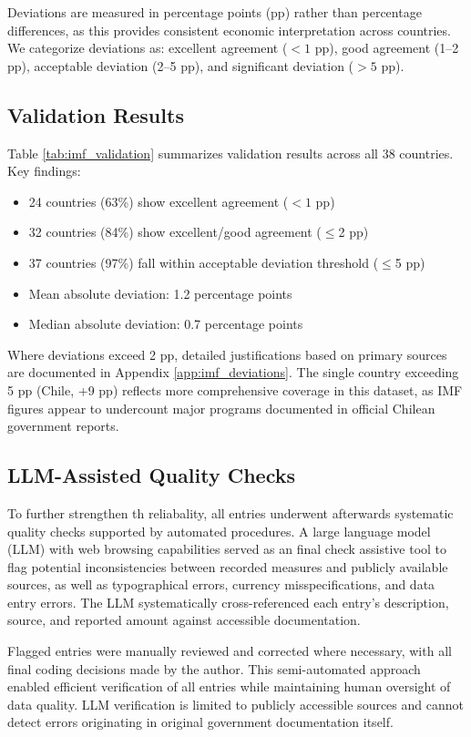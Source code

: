 \documentclass[12pt]{article}
\begin{document}
Deviations are measured in percentage points (pp) rather than percentage differences, as this provides consistent economic interpretation across countries. We categorize deviations as: excellent agreement ($<1$ pp), good agreement (1--2 pp), acceptable deviation (2--5 pp), and significant deviation ($>5$ pp).

\subsection{Validation Results}

Table \ref{tab:imf_validation} summarizes validation results across all 38 countries. Key findings:

\begin{itemize}
\item 24 countries (63\%) show excellent agreement ($<1$ pp)
\item 32 countries (84\%) show excellent/good agreement ($\leq$2 pp)
\item 37 countries (97\%) fall within acceptable deviation threshold ($\leq$5 pp)
\item Mean absolute deviation: 1.2 percentage points
\item Median absolute deviation: 0.7 percentage points
\end{itemize}

Where deviations exceed 2 pp, detailed justifications based on primary sources are documented in Appendix \ref{app:imf_deviations}. The single country exceeding 5 pp (Chile, +9 pp) reflects more comprehensive coverage in this dataset, as IMF figures appear to undercount major programs documented in official Chilean government reports.

\subsection{LLM-Assisted Quality Checks}

To further strengthen th reliabality, all entries underwent afterwards systematic quality checks supported by automated procedures. A large language model (LLM) with web browsing capabilities served as an final check assistive tool to flag potential inconsistencies between recorded measures and publicly available sources, as well as typographical errors, currency misspecifications, and data entry errors. The LLM systematically cross-referenced each entry's description, source, and reported amount against accessible documentation.

Flagged entries were manually reviewed and corrected where necessary, with all final coding decisions made by the author. This semi-automated approach enabled efficient verification of all entries while maintaining human oversight of data quality. LLM verification is limited to publicly accessible sources and cannot detect errors originating in original government documentation itself.
\end{document}
